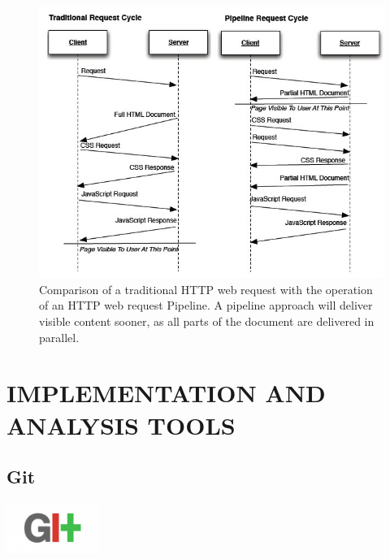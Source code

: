 \documentclass[12pt]{report}
\begin{document}
\begin{figure}[H]
\label{fig:HTTPRequestCycles}
\centering
\includegraphics[width=145mm]{figures/images/HTTP_request_cycles.jpg}
\caption{Comparison of a traditional HTTP web request with the operation of an HTTP web request Pipeline. A pipeline approach will deliver visible content sooner, as all parts of the  document are delivered in parallel.}
\end{figure}





\chapter{IMPLEMENTATION AND ANALYSIS TOOLS}

\section{Git}
\begin{center} 
\includegraphics[width=30mm]{figures/images/git_logo.png}
\end{center}
\end{document}

